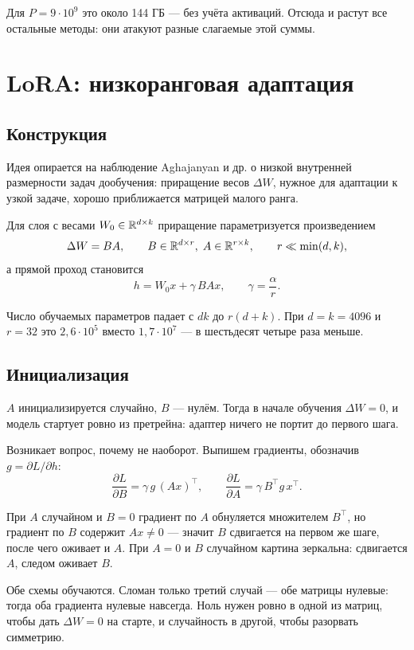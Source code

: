 \documentclass[11pt,a4paper]{article}
\begin{document}
Для $P = 9\cdot10^9$ это около 144 ГБ — без учёта активаций. Отсюда
и растут все остальные методы: они атакуют разные слагаемые этой суммы.

\section{LoRA: низкоранговая адаптация}

\subsection{Конструкция}

Идея опирается на наблюдение Aghajanyan и др. о низкой внутренней
размерности задач дообучения: приращение весов $\Delta W$, нужное для
адаптации к узкой задаче, хорошо приближается матрицей малого ранга.

Для слоя с весами $W_0 \in \mathbb{R}^{d \times k}$ приращение параметризуется
произведением
\[
\Delta W = BA, \qquad B \in \mathbb{R}^{d \times r},\; A \in \mathbb{R}^{r \times k},
\qquad r \ll \min(d,k),
\]
а прямой проход становится
\[
h = W_0 x + \gamma\, BAx, \qquad \gamma = \frac{\alpha}{r}.
\]

Число обучаемых параметров падает с $dk$ до $r(d+k)$. При $d=k=4096$
и $r=32$ это $2{,}6\cdot10^5$ вместо $1{,}7\cdot10^7$ — в шестьдесят
четыре раза меньше.

\subsection{Инициализация}

$A$ инициализируется случайно, $B$ — нулём. Тогда в начале обучения
$\Delta W = 0$, и модель стартует ровно из претрейна: адаптер ничего
не портит до первого шага.

Возникает вопрос, почему не наоборот. Выпишем градиенты, обозначив
$g = \partial L/\partial h$:
\[
\frac{\partial L}{\partial B} = \gamma\, g\,(Ax)^\top,
\qquad
\frac{\partial L}{\partial A} = \gamma\, B^\top g\, x^\top .
\]

При $A$ случайном и $B=0$ градиент по $A$ обнуляется множителем
$B^\top$, но градиент по $B$ содержит $Ax \neq 0$ — значит $B$
сдвигается на первом же шаге, после чего оживает и $A$. При $A=0$
и $B$ случайном картина зеркальна: сдвигается $A$, следом оживает $B$.

\begin{keybox}
Обе схемы обучаются. Сломан только третий случай — обе матрицы
нулевые: тогда оба градиента нулевые навсегда. Ноль нужен ровно
в одной из матриц, чтобы дать $\Delta W = 0$ на старте, и случайность
в другой, чтобы разорвать симметрию.
\end{keybox}
\end{document}
